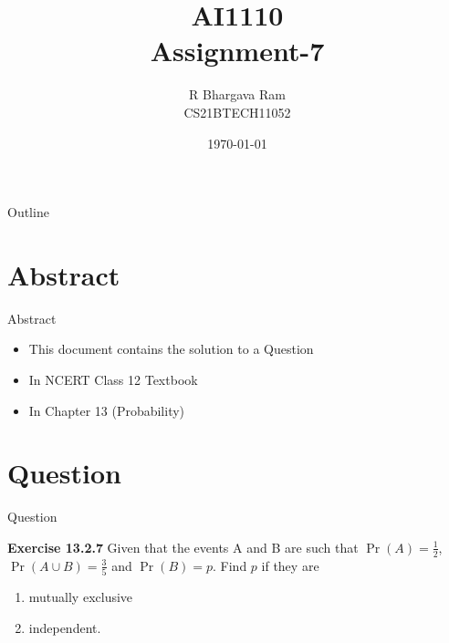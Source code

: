 \documentclass{beamer}
\title{AI1110 \\ Assignment-7}
\author{R Bhargava Ram \\ CS21BTECH11052}
\date{\today}
\providecommand{\pr}[1]{\ensuremath{\Pr\left(#1\right)}}
\begin{document}
\begin{frame}
    \titlepage 
\end{frame}

\logo{}


\begin{frame}{Outline}
    \tableofcontents
\end{frame}

\section{Abstract}
	\begin{frame}{Abstract}
		\begin{itemize}
			\item This document contains the solution to a Question
			\item In NCERT Class 12 Textbook
			\item In Chapter 13 (Probability)
		\end{itemize}
		
	\end{frame}


\section{Question}
    \begin{frame}{Question}
       \begin{block}{\textbf{Exercise 13.2.7}}
 Given that the events A and B are such that $\pr{A} = \frac{1}{2}$, $\pr{A \cup B} = \frac{3}{5}$ and $\pr{B} = p$. Find $p$ if they are
\begin{enumerate}
    \item  mutually exclusive  
    \item independent. 
\end{enumerate}
       \end{block}
         
    \end{frame}
\end{document}
